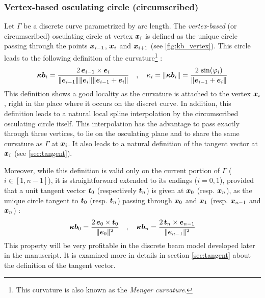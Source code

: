 \subsubsection{Vertex-based osculating circle (circumscribed)}\label{sec:circumscribed}
Let $\Gamma$ be a discrete curve parametrized by arc length. The \emph{vertex-based} (or circumscribed) osculating circle at vertex $\boldsymbol{x}_{i}$ is defined as the unique circle passing through the points $\boldsymbol{x}_{i-1}$, $\boldsymbol{x}_{i}$ and $\boldsymbol{x}_{i+1}$ (see \cref{fig:kb_vertex}). This circle leads to the following definition of the curvature\footnote{This curvature is also known as the \emph{Menger curvature}.} : 
\begin{equation}
	\boldsymbol{\kappa b}_i = \frac{2 \, \boldsymbol{e}_{i-1} \times \boldsymbol{e}_{i}}{\lVert\boldsymbol{e}_{i-1}\rVert \lVert\boldsymbol{e}_{i}\rVert \lVert\boldsymbol{e}_{i-1} + \boldsymbol{e}_{i}\rVert }
	\quad , \quad
	\kappa_i = \lVert\boldsymbol{\kappa b}_i\rVert = \frac{2 \, \sin(\varphi_i)}{\lVert\boldsymbol{e}_{i-1} + \boldsymbol{e}_{i}\rVert}
\label{eq:def_kb_vertex}
\end{equation}
This definition shows a good locality as the curvature is attached to the vertex $\boldsymbol{x}_{i}$, right in the place where it occurs on the discret curve. In addition, this definition leads to a natural local spline interpolation by the circumscribed osculating circle itself. This interpolation has the advantage to pass exactly through three vertices, to lie on the osculating plane and to share the same curvature as $\Gamma$ at $\boldsymbol{x}_{i}$. It also leads to a natural definition of the tangent vector at $\boldsymbol{x}_{i}$ (see \cref{sec:tangent}).

Moreover, while this definition is valid only on the current portion of $\Gamma$ ($i \in[1, n-1]$), it is straightforward extended to its endings ($i=0,1$), provided that a unit tangent vector $\boldsymbol{t}_{0}$ (respectively $\boldsymbol{t}_{n}$) is given at $\boldsymbol{x}_{0}$ (resp. $\boldsymbol{x}_{n}$), as the unique circle tangent to $\boldsymbol{t}_{0}$ (resp. $\boldsymbol{t}_{n}$) passing through $\boldsymbol{x}_0$ and $\boldsymbol{x}_1$ (resp. $\boldsymbol{x}_{n-1}$ and $\boldsymbol{x}_n$) :
\begin{equation}
	\boldsymbol{\kappa b}_0 = \frac{2 \, \boldsymbol{e}_{0} \times \boldsymbol{t}_{0}}{\lVert\boldsymbol{e}_{0}\rVert^2} 
	\quad , \quad
	\boldsymbol{\kappa b}_n = \frac{2 \, \boldsymbol{t}_{n} \times \boldsymbol{e}_{n-1}}{\lVert\boldsymbol{e}_{n-1}\rVert^2} 
\end{equation}
This property will be very profitable in the discrete beam model developed later in the manuscript. It is examined more in details in section \cref{sec:tangent} about the definition of the tangent vector.

